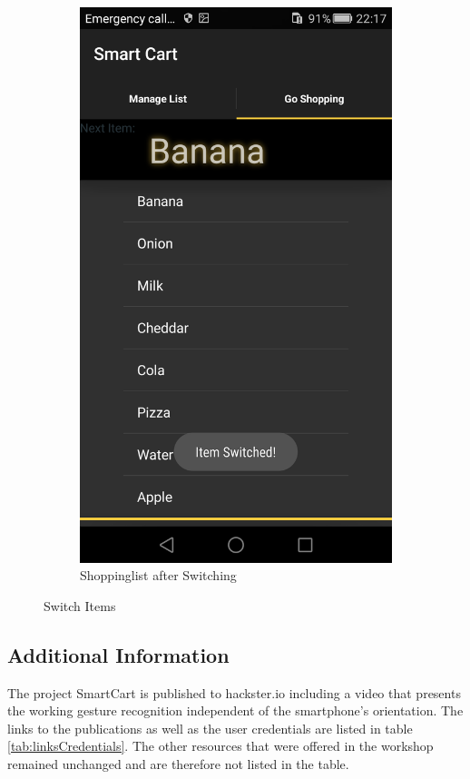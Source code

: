 \begin{figure}[h]
\begin{subfigure}{0.475\textwidth}
\centering
\includegraphics[height= 0.3\textheight]{res/usermanual/switched.png}
\caption{Shoppinglist after Switching}
\label{fig:afterSwitching}
\end{subfigure}
\caption{Switch Items}
\label{fig:checkItems}
\end{figure}

\subsection{Additional Information}
The project SmartCart is published to hackster.io including a video that
presents the working gesture recognition independent of the smartphone's
orientation. The links to the publications as well as the
user credentials are listed in table \ref{tab:linksCredentials}. The other
resources that were offered in the workshop remained unchanged and are therefore
not listed in the table.

